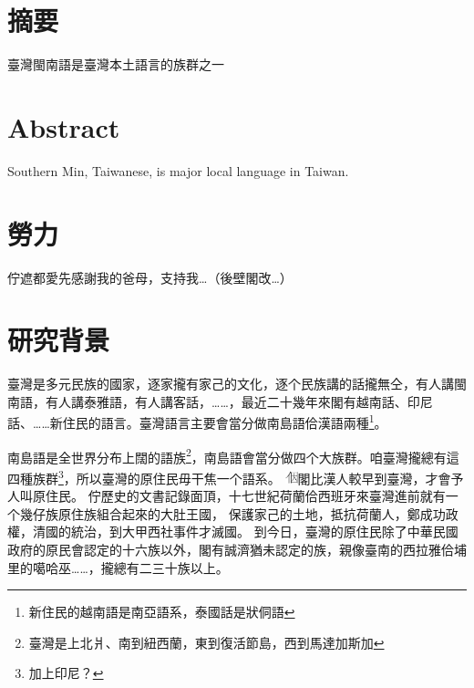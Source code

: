 \documentclass[final,oneside,onecolumn,12pt,a4paper]{book}%
\begin{document}

\newpage

\chapter{摘要}
臺灣閩南語是臺灣本土語言的族群之一

\newpage

\chapter{Abstract}
Southern Min, Taiwanese, is major local language in Taiwan.

\newpage

\chapter{勞力}
佇遮都愛先感謝我的爸母，支持我…（後壁閣改…）

\newpage

\tableofcontents
\listoffigures
\listoftables

\mainmatter

\chapter{研究背景}
\label{章：研究背景}
臺灣是多元民族的國家，逐家攏有家己的文化，逐个民族講的話攏無仝，有人講閩南語，有人講泰雅語，有人講客話，……，最近二十幾年來閣有越南話、印尼話、……新住民的語言。臺灣語言主要會當分做南島語佮漢語兩種\footnote{新住民的越南語是南亞語系，泰國話是狀侗語}。

南島語是全世界分布上闊的語族\footnote{臺灣是上北爿、南到紐西蘭，東到復活節島，西到馬達加斯加}，南島語會當分做四个大族群\cite{李壬癸}。咱臺灣攏總有這四種族群\footnote{加上印尼？}，所以臺灣的原住民毋干焦一个語系。
\includegraphics[height=1em]{字/⿰因}閣比漢人較早到臺灣，才會予人叫原住民。
佇歷史的文書記錄面頂，十七世紀荷蘭佮西班牙來臺灣進前就有一个幾仔族原住族組合起來的大肚王國\cite{大肚王國}，
保護家己的土地，抵抗荷蘭人，鄭成功政權，清國的統治，到大甲西社事件才滅國。
到今日，臺灣的原住民除了中華民國政府的原民會認定的十六族以外，閣有誠濟猶未認定的族，親像臺南的西拉雅佮埔里的噶哈巫……，攏總有二三十族以上。
\end{document}
